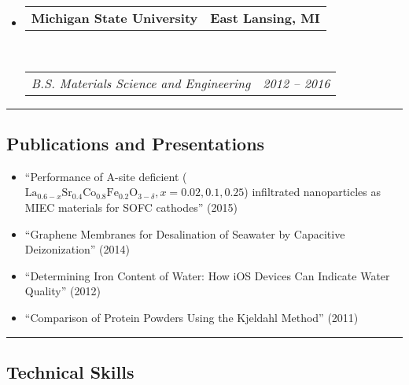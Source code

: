 \documentclass[10pt,letterpaper]{article}
\makeatletter
\newcommand{\headerrow}[2]
{\begin{tabular*}{\linewidth}{l@{\extracolsep{\fill}}r}
  #1 &
  #2 \\
\end{tabular*}}
\makeatother
\begin{document}
\begin{itemize}
  \parskip=0.1em

  \item 
  \headerrow
    {\textbf{Michigan State University}}
    {\textbf{East Lansing, MI}}
  \\
  \headerrow
    {\emph{B.S. Materials Science and Engineering}}
    {\emph{2012 -- 2016}}

\end{itemize}


\hrule
\vspace{-0.6em}
\subsection*{Publications and Presentations}

\begin{itemize}
  \parskip=0.1em

  \item ``Performance of A-site deficient
      ($\text{La}_{0.6-x}\text{Sr}_{0.4}\text{Co}_{0.8}\text{Fe}_{0.2}\text{O}_{3-\delta},
      x = 0.02, 0.1, 0.25$) infiltrated nanoparticles as MIEC materials for
      SOFC cathodes'' (2015)
  \item ``Graphene Membranes for Desalination of Seawater by Capacitive
      Deizonization'' (2014)
  \item ``Determining Iron Content of Water: How iOS Devices Can Indicate Water
      Quality'' (2012)
  \item ``Comparison of Protein Powders Using the Kjeldahl Method'' (2011)
\end{itemize}


\hrule
\vspace{-0.6em}
\subsection*{Technical Skills}
\end{document}
